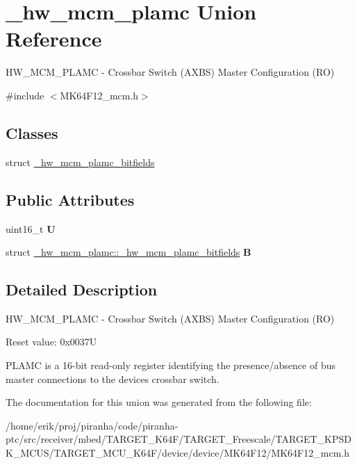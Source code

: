 \hypertarget{union__hw__mcm__plamc}{}\section{\+\_\+hw\+\_\+mcm\+\_\+plamc Union Reference}
\label{union__hw__mcm__plamc}


H\+W\+\_\+\+M\+C\+M\+\_\+\+P\+L\+A\+MC -\/ Crossbar Switch (A\+X\+BS) Master Configuration (RO)  




{\ttfamily \#include $<$M\+K64\+F12\+\_\+mcm.\+h$>$}

\subsection*{Classes}
\begin{DoxyCompactItemize}
\item 
struct \hyperlink{struct__hw__mcm__plamc_1_1__hw__mcm__plamc__bitfields}{\+\_\+hw\+\_\+mcm\+\_\+plamc\+\_\+bitfields}
\end{DoxyCompactItemize}
\subsection*{Public Attributes}
\begin{DoxyCompactItemize}
\item 
uint16\+\_\+t {\bfseries U}\hypertarget{union__hw__mcm__plamc_ac3a9210d0254c5060ba2b4121dcd9560}{}\label{union__hw__mcm__plamc_ac3a9210d0254c5060ba2b4121dcd9560}

\item 
struct \hyperlink{struct__hw__mcm__plamc_1_1__hw__mcm__plamc__bitfields}{\+\_\+hw\+\_\+mcm\+\_\+plamc\+::\+\_\+hw\+\_\+mcm\+\_\+plamc\+\_\+bitfields} {\bfseries B}\hypertarget{union__hw__mcm__plamc_a8fecedf48d30ce0179111fd5dbf1577f}{}\label{union__hw__mcm__plamc_a8fecedf48d30ce0179111fd5dbf1577f}

\end{DoxyCompactItemize}


\subsection{Detailed Description}
H\+W\+\_\+\+M\+C\+M\+\_\+\+P\+L\+A\+MC -\/ Crossbar Switch (A\+X\+BS) Master Configuration (RO) 

Reset value\+: 0x0037U

P\+L\+A\+MC is a 16-\/bit read-\/only register identifying the presence/absence of bus master connections to the device\textquotesingle{}s crossbar switch. 

The documentation for this union was generated from the following file\+:\begin{DoxyCompactItemize}
\item 
/home/erik/proj/piranha/code/piranha-\/ptc/src/receiver/mbed/\+T\+A\+R\+G\+E\+T\+\_\+\+K64\+F/\+T\+A\+R\+G\+E\+T\+\_\+\+Freescale/\+T\+A\+R\+G\+E\+T\+\_\+\+K\+P\+S\+D\+K\+\_\+\+M\+C\+U\+S/\+T\+A\+R\+G\+E\+T\+\_\+\+M\+C\+U\+\_\+\+K64\+F/device/device/\+M\+K64\+F12/M\+K64\+F12\+\_\+mcm.\+h\end{DoxyCompactItemize}
